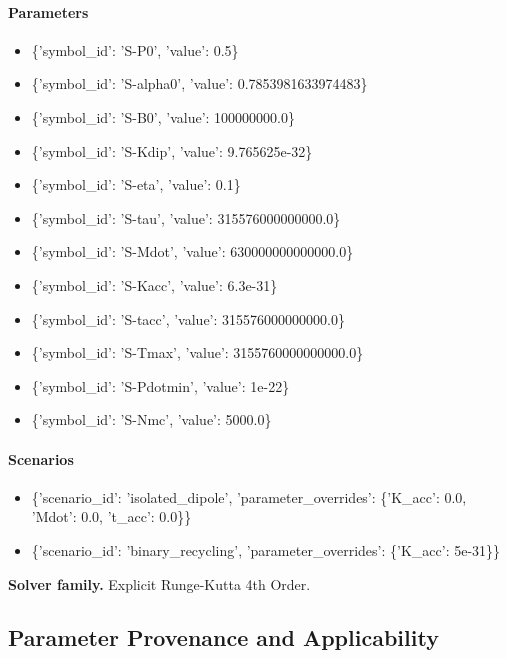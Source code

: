 \documentclass[11pt]{article}
\begin{document}
\paragraph{Parameters}
\begin{itemize}\raggedright
\item \{'symbol\_\allowbreak{}id': 'S-P0', 'value': 0.5\}
\item \{'symbol\_\allowbreak{}id': 'S-alpha0', 'value': 0.7853981633974483\}
\item \{'symbol\_\allowbreak{}id': 'S-B0', 'value': 100000000.0\}
\item \{'symbol\_\allowbreak{}id': 'S-Kdip', 'value': 9.765625e-32\}
\item \{'symbol\_\allowbreak{}id': 'S-eta', 'value': 0.1\}
\item \{'symbol\_\allowbreak{}id': 'S-tau', 'value': 315576000000000.0\}
\item \{'symbol\_\allowbreak{}id': 'S-Mdot', 'value': 630000000000000.0\}
\item \{'symbol\_\allowbreak{}id': 'S-Kacc', 'value': 6.3e-31\}
\item \{'symbol\_\allowbreak{}id': 'S-tacc', 'value': 315576000000000.0\}
\item \{'symbol\_\allowbreak{}id': 'S-Tmax', 'value': 3155760000000000.0\}
\item \{'symbol\_\allowbreak{}id': 'S-Pdotmin', 'value': 1e-22\}
\item \{'symbol\_\allowbreak{}id': 'S-Nmc', 'value': 5000.0\}
\end{itemize}

\paragraph{Scenarios}
\begin{itemize}\raggedright
\item \{'scenario\_\allowbreak{}id': 'isolated\_\allowbreak{}dipole', 'parameter\_\allowbreak{}overrides': \{'K\_\allowbreak{}acc': 0.0, 'Mdot': 0.0, 't\_\allowbreak{}acc': 0.0\}\}
\item \{'scenario\_\allowbreak{}id': 'binary\_\allowbreak{}recycling', 'parameter\_\allowbreak{}overrides': \{'K\_\allowbreak{}acc': 5e-31\}\}
\end{itemize}

\noindent\textbf{Solver family.} Explicit Runge-Kutta 4th Order.

\subsection{Parameter Provenance and Applicability}
\end{document}
